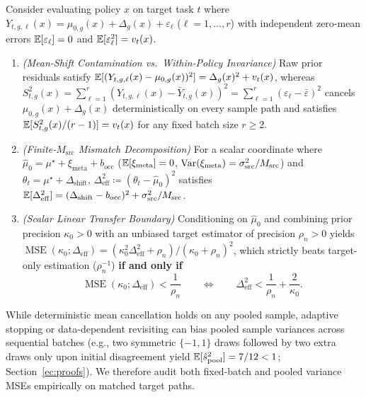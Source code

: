 \begin{theorem}\label{thm:transfer_boundary}
Consider evaluating policy $x$ on target task $t$ where $Y_{t,g,\ell}(x) = \mu_{0,g}(x) + \Delta_g(x) + \varepsilon_\ell$ ($\ell = 1,\dots,r$) with independent zero-mean errors $\mathbb{E}[\varepsilon_\ell]=0$ and $\mathbb{E}[\varepsilon_\ell^2] = v_t(x)$.
\begin{enumerate}
  \item \emph{(Mean-Shift Contamination vs.\ Within-Policy Invariance)} Raw prior residuals satisfy $\mathbb{E}[(Y_{t,g,\ell}(x) - \mu_{0,g}(x))^2] = \Delta_g(x)^2 + v_t(x)$, whereas $S_{t,g}^2(x) = \sum_{\ell=1}^r (Y_{t,g,\ell}(x) - \bar{Y}_{t,g}(x))^2 = \sum_{\ell=1}^r (\varepsilon_\ell - \bar{\varepsilon})^2$ cancels $\mu_{0,g}(x) + \Delta_g(x)$ deterministically on every sample path and satisfies $\mathbb{E}[S_{t,g}^2(x)/(r-1)] = v_t(x)$ for any fixed batch size $r \ge 2$.
  \item \emph{(Finite-$M_{\mathrm{src}}$ Mismatch Decomposition)} For a scalar coordinate where $\hat{\mu}_0 = \mu^\star + \xi_{\mathrm{meta}} + b_{\mathrm{occ}}$ ($\mathbb{E}[\xi_{\mathrm{meta}}]=0$, $\operatorname{Var}(\xi_{\mathrm{meta}}) = \sigma_{\mathrm{src}}^2 / M_{\mathrm{src}}$) and $\theta_t = \mu^\star + \Delta_{\mathrm{shift}}$, $\Delta_{\mathrm{eff}}^2 \coloneqq (\theta_t - \hat{\mu}_0)^2$ satisfies $\mathbb{E}[\Delta_{\mathrm{eff}}^2] = (\Delta_{\mathrm{shift}} - b_{\mathrm{occ}})^2 + \sigma_{\mathrm{src}}^2 / M_{\mathrm{src}}$.
  \item \emph{(Scalar Linear Transfer Boundary)} Conditioning on $\hat{\mu}_0$ and combining prior precision $\kappa_0 > 0$ with an unbiased target estimator of precision $\rho_n > 0$ yields $\operatorname{MSE}(\kappa_0; \Delta_{\mathrm{eff}}) = (\kappa_0^2\Delta_{\mathrm{eff}}^2 + \rho_n)/(\kappa_0 + \rho_n)^2$, which strictly beats target-only estimation ($\rho_n^{-1}$) \textbf{if and only if}
  \begin{equation}\label{eq:transfer_iff}
    \operatorname{MSE}(\kappa_0; \Delta_{\mathrm{eff}}) < \frac{1}{\rho_n}
    \qquad \Longleftrightarrow \qquad
    \Delta_{\mathrm{eff}}^2 < \frac{1}{\rho_n} + \frac{2}{\kappa_0}.
  \end{equation}
\end{enumerate}
\end{theorem}

While deterministic mean cancellation holds on any pooled sample, adaptive stopping or data-dependent revisiting can bias pooled sample variances across sequential batches (e.g., two symmetric $\{-1,1\}$ draws followed by two extra draws only upon initial disagreement yield $\mathbb{E}[\hat{s}_{\mathrm{pool}}^2] = 7/12 < 1$; Section~\ref*{ec:proofs}). We therefore audit both fixed-batch and pooled variance MSEs empirically on matched target paths.

